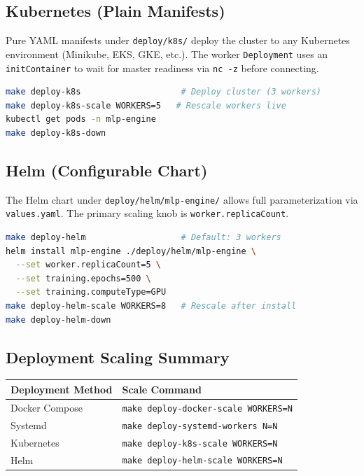 \documentclass[11pt, a4paper]{article}
\begin{document}
\subsection{Kubernetes (Plain Manifests)}
Pure YAML manifests under \texttt{deploy/k8s/} deploy the cluster to any Kubernetes environment (Minikube, EKS, GKE, etc.). The worker \texttt{Deployment} uses an \texttt{initContainer} to wait for master readiness via \texttt{nc -z} before connecting.
\begin{lstlisting}[language=bash]
make deploy-k8s                    # Deploy cluster (3 workers)
make deploy-k8s-scale WORKERS=5   # Rescale workers live
kubectl get pods -n mlp-engine
make deploy-k8s-down
\end{lstlisting}

\subsection{Helm (Configurable Chart)}
The Helm chart under \texttt{deploy/helm/mlp-engine/} allows full parameterization via \texttt{values.yaml}. The primary scaling knob is \texttt{worker.replicaCount}.
\begin{lstlisting}[language=bash]
make deploy-helm                   # Default: 3 workers
helm install mlp-engine ./deploy/helm/mlp-engine \
  --set worker.replicaCount=5 \
  --set training.epochs=500 \
  --set training.computeType=GPU
make deploy-helm-scale WORKERS=8   # Rescale after install
make deploy-helm-down
\end{lstlisting}

\subsection{Deployment Scaling Summary}
\begin{center}
\begin{tabular}{|l|l|}
\hline
\textbf{Deployment Method} & \textbf{Scale Command} \\
\hline
Docker Compose & \texttt{make deploy-docker-scale WORKERS=N} \\
Systemd        & \texttt{make deploy-systemd-workers N=N} \\
Kubernetes     & \texttt{make deploy-k8s-scale WORKERS=N} \\
Helm           & \texttt{make deploy-helm-scale WORKERS=N} \\
\hline
\end{tabular}
\end{center}
\end{document}
